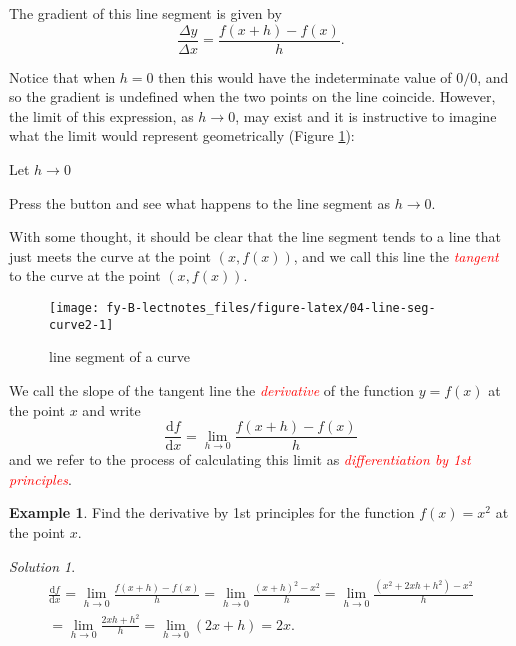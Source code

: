 \documentclass[
  11pt,
  oneside]{book}
\newcommand{\slide}{}
\theoremstyle{definition}
\theoremstyle{definition}
\newtheorem{example}{Example}[chapter]
\theoremstyle{definition}
\theoremstyle{definition}
\theoremstyle{remark}
\newtheorem*{solution}{Solution}
\begin{document}
The gradient of this line segment is given by
\[
\frac{\Delta y}{\Delta x} = \frac{f(x+h)-f(x)}{h}.
\]
\slide

Notice that when \(h=0\) then this would have the indeterminate value of \(0/0\), and so the gradient is undefined when the two points on the line coincide. However, the limit of this expression, as \(h\to0\), may exist and it is instructive to imagine what the limit would represent geometrically (Figure \ref{fig:04-line-seg-curve2}):

\begin{htmlonly}

\label{div_head}
Let \(h\to 0\)

\label{div_body}

Press the button and see what happens to the line segment as \(h\to0\).

\end{htmlonly}

With some thought, it should be clear that the line segment tends to a line that just meets the curve at the point \((x,f(x))\), and we call this line the \textcolor{red}{\em tangent} to the curve at the point \((x,f(x))\).

\begin{figure}

{\centering \texttt{[image: fy-B-lectnotes\_files/figure-latex/04-line-seg-curve2-1]} 

}

\caption{line segment of a curve}\label{fig:04-line-seg-curve2}
\end{figure}

\slide

We call the slope of the tangent line the \textcolor{red}{\em derivative} of the function \(y=f(x)\) at the point \(x\) and write
\[
\frac{\mathrm{d} f}{\mathrm{d} x} = \lim\limits_{h\to0}\frac{f(x+h)-f(x)}{h}
\]
and we refer to the process of calculating this limit as \textcolor{red}{\em differentiation by 1st principles}.

\slide

\begin{example}
Find the derivative by 1st principles for the function \(f(x) = x^2\) at the point \(x\).
\end{example}

\begin{solution}
\begin{gather*}
\frac{\mathrm{d} f}{\mathrm{d} x} = \lim\limits_{h\to0}\frac{f(x+h)-f(x)}{h} = \lim\limits_{h\to0}\frac{(x+h)^2 - x^2}{h} = \lim\limits_{h\to0}\frac{(x^2+2xh+h^2)-x^2}{h}\\ = \lim\limits_{h\to0}\frac{2xh+h^2}{h} = \lim\limits_{h\to0}(2x+h) = 2x.
\end{gather*}
\end{solution}
\end{document}
